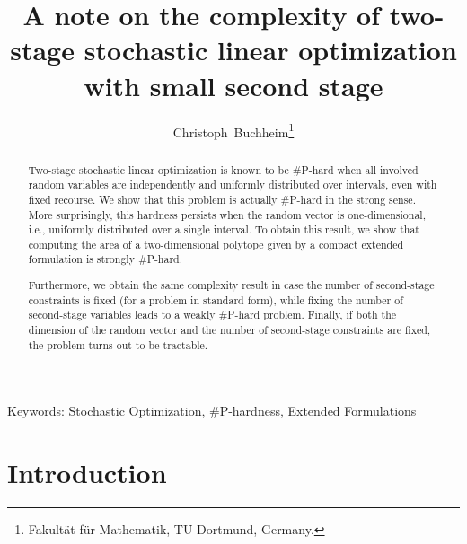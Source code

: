 \documentclass{article}
\title{A note on the complexity of two-stage stochastic linear optimization with small second stage}
\author{Christoph~Buchheim\thanks{Fakult\"at f\"ur Mathematik, TU Dortmund, Germany. \email{christoph.buchheim@tu-dortmund.de}}}
\newenvironment{keywords}{\begin{center}Keywords:}{\end{center}}
\newcommand{\card}{\#}
\begin{document}
\maketitle

\begin{abstract}
  Two-stage stochastic linear optimization is known to be \card P-hard
  when all involved random variables are independently and uniformly
  distributed over intervals, even with fixed recourse. We show that
  this problem is actually \card P-hard in the strong sense. More
  surprisingly, this hardness persists when the random vector is
  one-dimensional, i.e., uniformly distributed over a single
  interval. To obtain this result, we show that computing the area of
  a two-dimensional polytope given by a compact extended formulation
  is strongly \card P-hard.
  
  Furthermore, we obtain the same complexity result in case the number
  of second-stage constraints is fixed (for a problem in standard
  form), while fixing the number of second-stage variables leads to a
  weakly \card P-hard problem. Finally, if both the dimension of the
  random vector and the number of second-stage constraints are fixed,
  the problem turns out to be tractable.
\end{abstract}

\begin{keywords}
  Stochastic Optimization, \card P-hardness, Extended Formulations
\end{keywords}

\section{Introduction}
\end{document}
